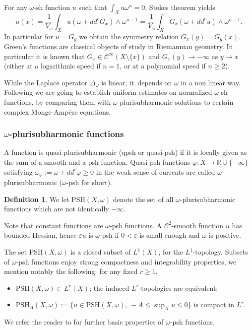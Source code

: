 \documentclass[11pt]{article}
\numberwithin{equation}{section}
\theoremstyle{definition}
\newtheorem{defi}[theorem]{Definition}
\newcommand{\R}{\mathbb R}
\let\e\varepsilon
\let\f\varphi
\newcommand \PSH {\mathrm{PSH}}
\begin{document}
For any $\omega$-sh function $u$ such that $\int_X u \omega^n=0$, Stokes theorem yields
\[
u(x)=\frac{1}{V_{\omega}} \int_X u(\omega+dd^c G_x) \wedge \omega^{n-1}=\frac{1}{V_{\omega}} \int_X G_x (\omega+dd^c u) \wedge \omega^{n-1}.
\]
In particular for $u=G_y$ we obtain the symmetry relation $G_x(y)=G_y(x)$.
Green's functions are classical objects of study in Riemannian geometry. In particular it is known
that $G_x \in {\mathcal C}^{\infty}(X \setminus \{x \})$ and $G_x(y) \rightarrow -\infty$ as
$y \rightarrow x$ (either at a logarithmic speed if $n=1$, or at a polynomial speed if $n \geq 2$).

While the Laplace operator $\Delta_{\omega}$ is linear, it~depends on $\omega$ in a non linear way.
Following \cite{GPS22,GPSS22,GPSS23} we are going to establish uniform estimates on normalized
$\omega$-sh functions, by comparing them with $\omega$-plurisubharmonic solutions to certain complex Monge-Ampère equations.

\subsubsection{$\omega$-plurisubharmonic functions}

A function is quasi-plurisub\-harmonic (qpsh or quasi-psh) if it is locally given as the sum of a smooth and a psh function.
Quasi-psh functions
$\f:X \rightarrow \R \cup \{-\infty\}$ satisfying
$
\omega_{\f}:=\omega+dd^c \f \geq 0
$
in the weak sense of currents are called $\omega$-plurisubharmonic ($\omega$-psh for short).

\begin{defi}
We let $\PSH(X,\omega)$ denote the set of all $\omega$-plurisubharmonic functions which are not identically $-\infty$.
\end{defi}

Note that constant functions are $\omega$-psh functions.
A ${\mathcal C}^2$-smooth function $u$ has bounded Hessian, hence $\e u$ is
$\omega$-psh if $0<\e$ is small enough and $\omega$ is positive.

The set $\PSH(X,\omega)$ is a closed subset of $L^1(X)$, for the $L^1$-topology.
Subsets of $\omega$-psh functions enjoy strong compactness and integrability properties,
we mention notably the following: for any fixed $r \geq 1$,
\begin{itemize}
\item $\PSH(X,\omega) \subset L^r(X)$;
the induced $L^r$-topologies are equivalent;
\item $\PSH_A(X,\omega):=\{ u \in\PSH(X,\omega), \, -A \leq \sup_X u \leq 0 \}$ is compact in $L^r$.
\end{itemize}
We refer the reader to \cite{Dem12,GZbook} for further basic properties of $\omega$-psh functions.
\end{document}
